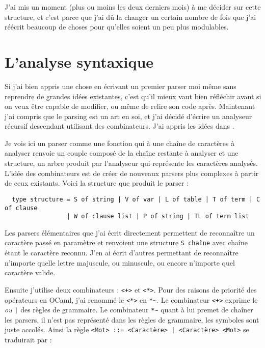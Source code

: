 \documentclass{article}
\begin{document}
J'ai mis un moment (plus ou moins les deux derniers mois) à me décider sur cette structure, et c'est parce que j'ai dû la changer un certain nombre de fois que j'ai réécrit beaucoup de choses pour qu'elles soient un peu plus modulables.



\section{L'analyse syntaxique}

Si j'ai bien appris une chose en écrivant un premier parser moi même sans reprendre de grandes idées existantes, c'est qu'il mieux vaut bien réfléchir avant si on veux être capable de modifier, ou même de relire son code après. Maintenant j'ai compris que le parsing est un art en soi, et j'ai décidé d'écrire un analyseur récursif descendant utilisant des combinateurs. J'ai appris les idées dans \cite{Ljunglof}.

Je vois ici un parser comme une fonction qui à une chaîne de caractères à analyser renvoie un couple composé de la chaîne restante à analyser et une structure, un arbre produit par l'analyseur qui représente les caractères analysés. L'idée des combinateurs est de créer de nouveaux parsers plus complexes à partir de ceux existants. Voici la structure que produit le parser :

\begin{verbatim}
  type structure = S of string | V of var | L of table | T of term | C of clause
                 | W of clause list | P of string | TL of term list
\end{verbatim}

Les parsers élémentaires que j'ai écrit directement permettent de reconnaître un caractère passé en paramètre et renvoient une structure \texttt{S chaîne} avec chaîne étant le caractère reconnu. J'en ai écrit d'autres permettant de reconnaître n'importe quelle lettre majuscule, ou minuscule, ou encore n'importe quel caractère valide.

Ensuite j'utilise deux combinateurs : \texttt{<+>} et \texttt{<*>}. Pour des raisons de priorité des opérateurs en OCaml, j'ai renommé le \texttt{<*>} en \texttt{*\textasciitilde*}. Le combinateur \texttt{<+>} exprime le \emph{ou} \texttt{|} des règles de grammaire. Le combinateur \texttt{*\textasciitilde*} quant à lui premet de chaîner les parsers, il n'est pas représenté dans les règles de grammaire, les symboles sont juste accolés. Ainsi la règle \texttt{<Mot> ::= <Caractère> | <Caractère> <Mot>} se traduirait par :
\end{document}
